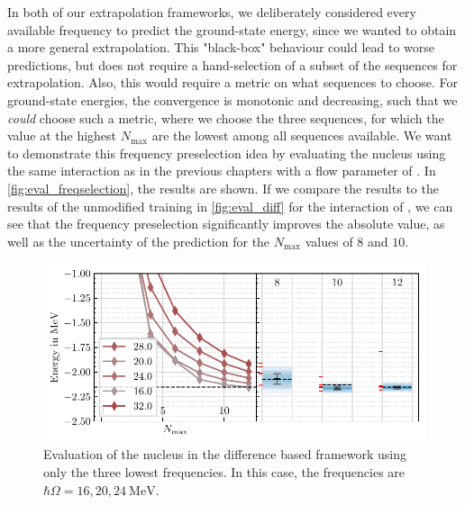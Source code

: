 In both of our extrapolation frameworks, we deliberately considered every available frequency to predict the ground-state energy, since we wanted to obtain a more general extrapolation. This "black-box" behaviour could lead to worse predictions, but does not require a hand-selection of a subset of the sequences for extrapolation. Also, this would require a metric on what sequences to choose. For ground-state energies, the convergence is monotonic and decreasing, such that we \textit{could} choose such a metric, where we choose the three sequences, for which the value at the highest $N_\mathrm{max}$ are the lowest among all sequences available. We want to demonstrate this frequency preselection idea by evaluating the  nucleus using the same interaction as in the previous chapters with a flow parameter of . In \autoref{fig:eval_freqselection}, the results are shown. If we compare the results to the results of the unmodified training in \autoref{fig:eval_diff} for the  interaction of , we can see that the frequency preselection significantly improves the absolute value, as well as the uncertainty of the prediction for the $N_\mathrm{max}$ values of $8$ and $10$.
\begin{figure}[H]
  \centering
  \includegraphics{media/outlook_selection.pdf}
  \caption{Evaluation of the  nucleus in the difference based framework using only the three lowest frequencies. In this case, the frequencies are $\hbar\Omega = 16, 20, \SI{24}{\mega\electronvolt}$.}
  \label{fig:eval_freqselection}
\end{figure}

